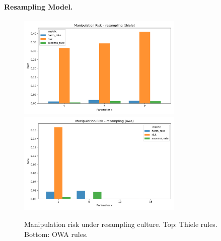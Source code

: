 \documentclass[11pt]{article}
\begin{document}
\paragraph{Resampling Model.}
\begin{figure}[h!]
\centering
\includegraphics[width=0.7\textwidth]{figures/risk_resampling_thiele.pdf}
\includegraphics[width=0.7\textwidth]{figures/risk_resampling_owa.pdf}
\caption{Manipulation risk under resampling culture. Top: Thiele rules. Bottom: OWA rules.}
\end{figure}
\end{document}
